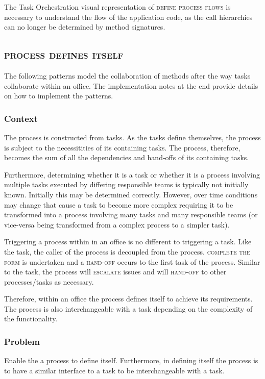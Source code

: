 \documentclass[prodmode]{style/acmlarge}
\begin{document}
The Task Orchestration visual representation of \textsc{define process flows} is
necessary to understand the flow of the application code, as the call
hierarchies can no longer be determined by method signatures.



\subsection{\textsc{\textbf{process defines itself}}}

The following patterns model the collaboration of methods after the way tasks
collaborate within an office.  The implementation notes at the end provide
details on how to implement the patterns.

\subsubsection*{Context} The process is constructed from tasks.  As the tasks
define themselves, the process is subject to the necessitities of its containing
tasks.  The process, therefore, becomes the sum of all the dependencies and
hand-offs of its containing tasks.

Furthermore, determining whether it is a task or whether it is a process involving
multiple tasks executed by differing responsible teams is typically not
initially known.  Initially this may be determined correctly.  However, over
time conditions may change that cause a task to become more complex requiring
it to be transformed into a process involving many tasks and many responsible
teams (or vice-versa being transformed from a complex process to a simpler task).

Triggering a process within in an office is no different to triggering a task.
Like the task, the caller of the process is decoupled from the process.
\textsc{complete the form} is undertaken and a \textsc{hand-off} occurs to the
first task of the process.  Similar to the task, the process will
\textsc{escalate} issues and will \textsc{hand-off} to other processes/tasks as
necessary.

Therefore, within an office the process defines itself to achieve its
requirements.  The process is also interchangeable with a task depending on the
complexity of the functionality.

\subsubsection*{Problem} Enable the a process to define itself.  Furthermore, in
defining itself the process is to have a similar interface to a task to be
interchangeable with a task.
\end{document}
